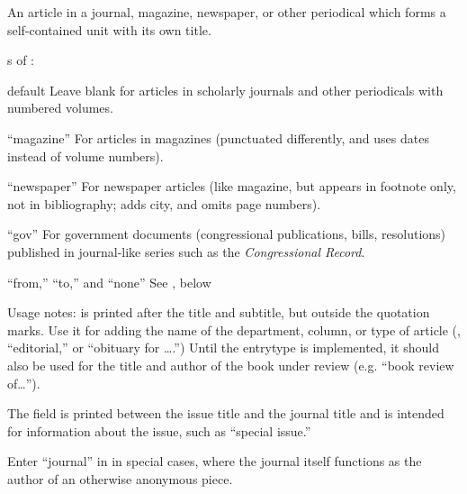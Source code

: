 \documentclass{ltxdockit}[2010/02/12]
\begin{document}
\begin{typelist}



An article in a journal, magazine, newspaper, or other periodical which forms a self-contained unit with its own title. 

s of :
\begin{valuelist}
\item[default] Leave  blank for articles in scholarly journals and other periodicals with numbered volumes.
\item[``magazine''] For articles in magazines (punctuated differently, and uses dates instead of volume numbers).
\item[``newspaper''] For newspaper articles (like magazine, but appears in footnote only, not in bibliography; adds city, and omits page numbers).
\item[``gov''] For government documents (\eg congressional publications, bills, resolutions) published in journal-like series such as the \emph{Congressional Record}.
\item[``from,'' ``to,'' and ``none''] See , below
\end{valuelist}


Usage notes:  is printed after the title and subtitle, but outside the quotation marks. Use it for adding the name of the department, column, or type of article (\eg, ``editorial,'' or ``obituary for \dots.'') Until the entrytype  is implemented, it should also be used for the title and author of the book under review (e.g. ``book review of\dots'').

The  field is printed between the issue title and the journal title and is intended for information about the issue, such as ``special issue.''

Enter ``journal'' in  in special cases, where the journal itself functions as the author of an otherwise anonymous piece.


\end{typelist}
\end{document}
